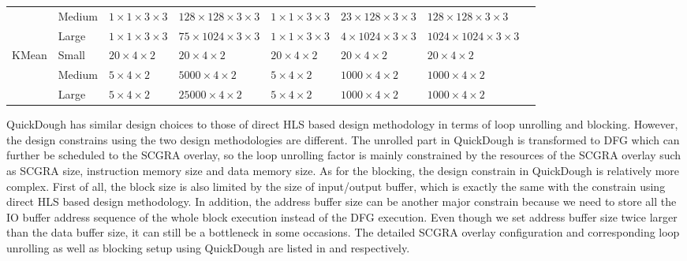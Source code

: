 \begin{table*}[htpb]
\begin{tabular}{l|l|l|l|l|l|l|l}
                       & Medium & $1 \times 1 \times 3 \times 3$ & $128 \times 128 \times 3 \times 3$ & $1 \times 1 \times 3 \times 3$ & $23 \times 128 \times 3 \times 3$ & $128 \times 128 \times 3 \times 3$ \\ \cline{2-7} 
                       & Large & $1 \times 1 \times 3 \times 3$ & $75 \times 1024 \times 3 \times 3$ & $1 \times 1 \times 3 \times 3$ & $4 \times 1024 \times 3 \times 3$ & $1024 \times 1024 \times 3 \times 3$ \\ \hline
\multirow{3}{*}{KMean} & Small & $20 \times 4 \times 2$ & $20 \times 4 \times 2$ & $20 \times 4 \times 2$ & $20 \times 4 \times 2$ & $20 \times 4 \times 2$ \\ \cline{2-7} 
                       & Medium & $5 \times 4 \times 2$ & $5000 \times 4 \times 2$ & $5 \times 4 \times 2$ & $1000 \times 4 \times 2$ & $1000 \times 4 \times 2$ \\ \cline{2-7} 
                       & Large & $5 \times 4 \times 2$ & $25000 \times 4 \times 2$ & $5 \times 4 \times 2$ & $1000 \times 4 \times 2$ & $1000 \times 4 \times 2$ \\ \hline
\end{tabular}
\end{table*}

QuickDough has similar design choices to those of direct HLS based design methodology in terms of loop unrolling and blocking. However, the design constrains using the two design methodologies are different. The unrolled part in QuickDough is transformed to DFG which can further be scheduled to the SCGRA overlay, so the loop unrolling factor is mainly constrained by the resources of the SCGRA overlay such as SCGRA size, instruction memory size and data memory size. As for the blocking, the design constrain in QuickDough is relatively more complex. First of all, the block size is also limited by the size of input/output buffer, which is exactly the same with the constrain using direct HLS based design methodology. In addition, the address buffer size can be another major constrain because we need to store all the IO buffer address sequence of the whole block execution instead of the DFG execution. Even though we set address buffer size twice larger than the data buffer size, it can still be a bottleneck in some occasions. The detailed SCGRA overlay configuration and corresponding loop unrolling as well as blocking setup using QuickDough are listed in  and  respectively. 

